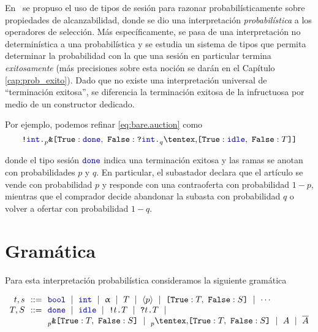 \label{cap:tipos_sesion_prob}
En~\cite{DBLP:conf/concur/InversoMPTT20} se propuso el uso de tipos de sesión
para razonar probabilísticamente sobre propiedades de alcanzabilidad, donde se
dio una interpretación \emph{probabilística} a los operadores de selección. Más
específicamente, se pasa de una interpretación no determinística a una
probabilística y se estudia un sistema de tipos que permita determinar la
probabilidad con la que una sesión en particular termina \emph{exitosamente}
(más precisiones sobre esta noción se darán en el Capítulo
\ref{cap:prob_exito}).  Dado que no existe una interpretación universal de
``terminación exitosa'', se diferencia la terminación exitosa de la infructuosa
por medio de un constructor dedicado.

Por ejemplo, podemos refinar \eqref{eq:bare.auction} como
\begin{equation}
    \label{eq:refined.auction}
    \Out\tint{
        \BinaryPBranch[p]\Done{
            \In\tint{
                \BinaryPChoice[q]\Idle\T
            }
        }
    }
\end{equation}

donde el tipo sesión $\Done$ indica una terminación exitosa y las
ramas se anotan con probabilidades $p$ y $q$. En particular, el subastador
declara que el artículo se vende con probabilidad $p$ y responde con una
contraoferta con probabilidad $1-p$, mientras que el comprador decide abandonar
la subasta con probabilidad $q$ o volver a ofertar con probabilidad $1-q$.

\section{Gramática}
\label{sec:gramatica_prob}

Para esta interpretación probabilística consideramos la siguiente gramática

\[
\begin{array}{@{}r@{~~}c@{~~}l@{}}
\TypeT, \TypeS & ::= &
\tbool
\rulemid \tint
\rulemid \tvar
\rulemid \SessionType
\rulemid \ClosedSessionType
\rulemid \BinaryLabels{\SessionTypeT}{\SessionTypeS}
\rulemid \cdots
\\
\SessionTypeT, \SessionTypeS & ::= &
\Done
\rulemid \Idle
\rulemid \Out\Type\SessionType
\rulemid \In\Type\SessionType
\rulemid
\\
	& &
\BinaryPBranch[p]\SessionTypeT\SessionTypeS
\rulemid \BinaryPChoice[p]\SessionTypeT\SessionTypeS
\rulemid \etvarA
\rulemid \dual\etvarA
\end{array}
\]

